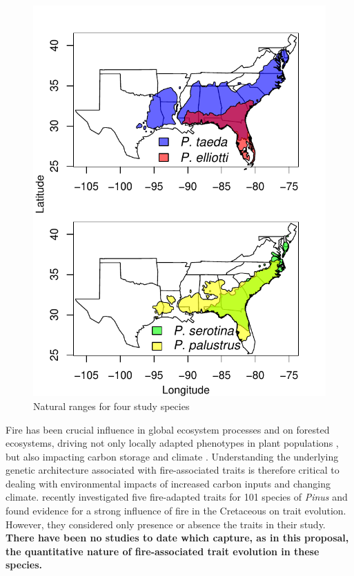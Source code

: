 \begin{figure}
\vspace{-30pt}
\centering
\includegraphics[scale=0.7]{rangemap}
\caption{Natural ranges for four study species}
\label{f:range}
\vspace{-10pt}
\end{figure}


Fire has been crucial influence in global ecosystem processes and on forested ecosystems, driving not only locally 
adapted phenotypes in plant populations \citep{Lamont:1991js,Vega:2008vk,Midgley:2011dw,Keeley:2011jw,
He:2012bz,Parchman:2012ca}, but also impacting carbon storage and climate \citep{Bowman:2009kp}.  
Understanding the underlying genetic architecture 
associated with fire-associated traits is therefore critical to dealing with environmental impacts of increased carbon inputs and 
changing climate.  \citet{He:2012bz} recently investigated five fire-adapted traits for 101 species of \emph{Pinus} and found evidence 
for a strong influence of fire in the Cretaceous on trait evolution.  However, they considered only presence or absence the traits in 
their study.  \textbf{There have been no studies to date which capture, as in this proposal, the quantitative nature of fire-associated trait 
evolution in these species.} 

